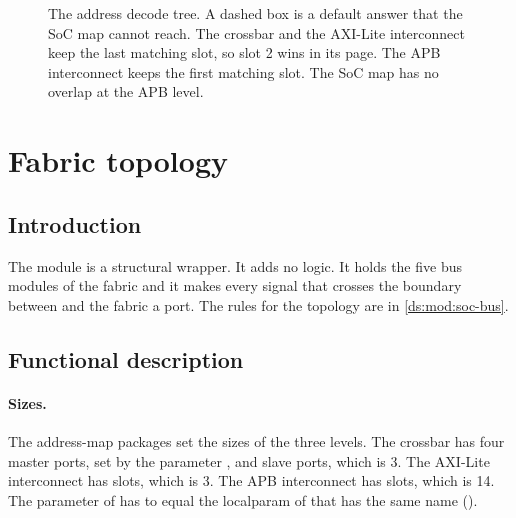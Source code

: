\begin{figure}[ht]
{}
  \caption{The address decode tree. A dashed box is a default answer that the SoC map cannot reach. The crossbar and the AXI-Lite interconnect keep the last matching slot, so slot 2 wins in its page. The APB interconnect keeps the first matching slot. The SoC map has no overlap at the APB level.}\label{fig:tm:ch:mod-bus-fabric:decode}
\end{figure}

\section{Fabric topology}\label{tm:mod:soc-bus}

\subsection{Introduction}
The module  is a structural wrapper. It adds no logic. It holds the five bus modules of the fabric and it makes every signal that crosses the boundary between  and the fabric a port. The rules for the topology are in \cref{ds:mod:soc-bus}.

\subsection{Functional description}
\paragraph{Sizes.} The address-map packages set the sizes of the three levels. The crossbar has four master ports, set by the parameter , and  slave ports, which is 3. The AXI-Lite interconnect has  slots, which is 3. The APB interconnect has  slots, which is 14. The parameter  of  has to equal the localparam of  that has the same name ().

